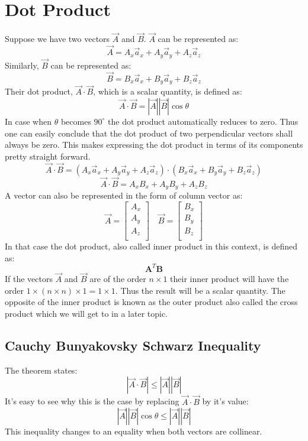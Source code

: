     \section{Dot Product}
        Suppose we have two vectors $\vec{A}$ and $\vec{B}$. $\vec{A}$ can be represented as:
        $$\vec{A} = A_x\vec{a}_x + A_y\vec{a}_y + A_z\vec{a}_z$$
        Similarly, $\vec{B}$ can be represented as:
        $$\vec{B} = B_x\vec{a}_x + B_y\vec{a}_y + B_z\vec{a}_z$$
        Their dot product, $\vec{A}\cdot \vec{B}$, which is a scalar quantity, is defined as:
        $$\vec{A}\cdot \vec{B} = |\vec{A}||\vec{B}|\cos \theta$$
        In case when $\theta$ becomes $90^{\circ}$ the dot product automatically reduces to zero. Thus one can easily conclude that the dot product of two perpendicular vectors shall always be zero. This makes expressing the dot product in terms of its components pretty straight forward.
        $$\vec{A}\cdot \vec{B} = \left(A_x\vec{a}_x + A_y\vec{a}_y + A_z\vec{a}_z\right)\cdot \left(B_x\vec{a}_x + B_y\vec{a}_y + B_z\vec{a}_z\right)$$
        \begin{equation}\label{eq:dotproduct}
           \vec{A}\cdot \vec{B} = A_xB_x + A_yB_y + A_zB_z
        \end{equation}
        A vector can also be represented in the form of column vector as:
        $$ \vec{A} = \begin{bmatrix}A_x \\A_y \\A_z\\ \end{bmatrix} \quad \vec{B} = \begin{bmatrix}B_x \\B_y \\B_z\\ \end{bmatrix} $$
        In that case the dot product, also called inner product in this context, is defined as:
        $$ \mathbf{A}^{T}\mathbf{B} $$
        If the vectors $\vec{A}$ and $\vec{B}$ are of the order $n \times 1$ their inner product will have the order $ 1 \times \left(n \times n\right) \times 1 = 1 \times 1$. Thus the result will be a scalar quantity.
        The opposite of the inner product is known as the outer product also called the cross product which we will get to in a later topic.
        
        \subsection{Cauchy Bunyakovsky Schwarz Inequality}
            The theorem states:
            $$|\vec{A}\cdot \vec{B}| \leq |\vec{A}||\vec{B}|$$
            It's easy to see why this is the case by replacing $\vec{A}\cdot \vec{B}$ by it's value:
            $$|\vec{A}||\vec{B}|\cos \theta \leq |\vec{A}||\vec{B}| $$
            This inequality changes to an equality when both vectors are collinear.
        
